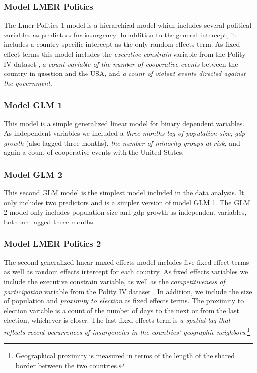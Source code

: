 \documentclass[pdftex,12pt,fullpage,oneside]{amsart}
\begin{document}
\subsubsection{Model LMER Politics}
The Lmer Politics 1 model is a hierarchical model which includes
several political variables as predictors for insurgency. In addition
to the general intercept, it includes a country specific intercept as
the only random effects term. As fixed effect terms this model
includes the \textit{executive constrain} variable from the Polity IV dataset
\citep{PolityIV}, \textit{a count variable of the number of cooperative events}
between the country in question and the USA, and \textit{a count of violent
events directed against the government}.

\subsubsection{Model GLM 1}
This model is a simple generalized linear model for binary dependent
variables. As independent variables we included a \textit{three months lag of
population size}, \textit{gdp growth} (also lagged three months), \textit{the number of
minority groups at risk}, and again a count of cooperative events with
the United States.

\subsubsection{Model GLM 2}
This second GLM model is the simplest model included in the data
analysis. It only includes two predictors and is a simpler version of
model GLM 1. The GLM 2 model only includes population size and gdp
growth as independent variables, both are lagged three months.

\subsubsection{Model LMER Politics 2}
The second generalized linear mixed effects model includes five fixed
effect terms as well as random effects intercept for each country. As
fixed effects variables we include the executive constrain variable,
as well as the \textit{competitiveness of participation} variable from the
Polity IV dataset \citep{PolityIV}. In addition, we include the size of
population and \textit{proximity to election} as fixed effects terms. The
proximity to election variable is a count of the number of days to the
next or from the last election, whichever is closer. The last fixed
effects term is \textit{a spatial lag that reflects recent occurrences of
insurgencies in the countries' geographic
neighbors}.\footnote{Geographical proximity is measured in terms of the
  length of the shared border between the two countries.}
\end{document}
